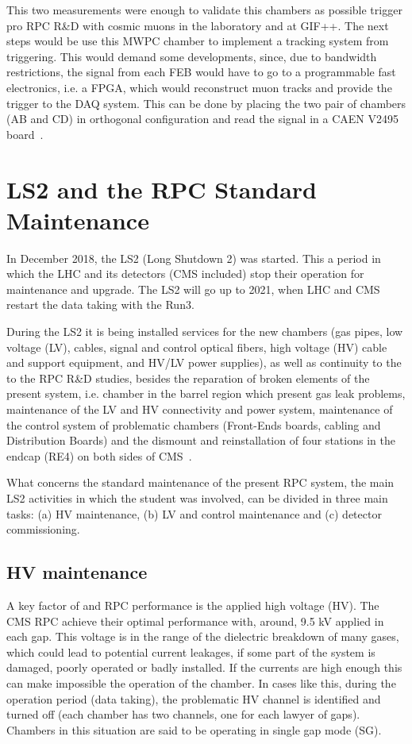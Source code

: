 This two measurements were enough to validate this chambers as possible trigger pro RPC R\&D with cosmic muons in the laboratory and at GIF++. The next steps would be use this MWPC chamber to implement a tracking system from triggering. This would demand some developments, since, due to bandwidth restrictions, the signal from each FEB would have to go to a programmable fast electronics, i.e. a FPGA, which would reconstruct muon tracks and provide the trigger to the DAQ system. This can be done by placing the two pair of chambers (AB and CD) in orthogonal configuration and read the signal in a CAEN V2495 board~\cite{caen_fpga}. 


\clearpage

\section{LS2 and the RPC Standard Maintenance}

In December 2018, the LS2 (Long Shutdown 2) was started. This a period in which the LHC and its detectors (CMS included) stop their operation for maintenance and upgrade. The LS2 will go up to 2021, when LHC and CMS restart the data taking with the Run3. 

During the LS2 it is being installed services for the new chambers (gas pipes, low voltage (LV), cables, signal and control optical fibers, high voltage (HV) cable and support equipment, and HV/LV power supplies), as well as continuity to the to the RPC R\&D studies, besides the reparation of broken elements of the present system, i.e. chamber in the barrel region which present gas leak problems, maintenance of the LV and HV connectivity and power system, maintenance of the control system of problematic chambers (Front-Ends boards, cabling and Distribution Boards) and the dismount and reinstallation of four stations in the endcap (RE4) on both sides of CMS~\cite{re4_dismount}.

What concerns the standard maintenance of the present RPC system, the main LS2 activities in which the student was involved, can be divided in three main tasks: (a) HV maintenance, (b) LV and control maintenance and (c) detector commissioning. 

\subsection{HV maintenance}

A key factor of and RPC performance is the applied high voltage (HV). The CMS RPC achieve their optimal performance with, around, 9.5 kV applied in each gap. This voltage is in the range of the dielectric breakdown of many gases, which could lead to potential current leakages, if some part of the system is damaged, poorly operated or badly installed. If the currents are high enough this can make impossible the operation of the chamber. In cases like this, during the operation period (data taking), the problematic HV channel is identified and turned off (each chamber has two channels, one for each lawyer of gaps). Chambers in this situation are said to be operating in single gap mode (SG).

